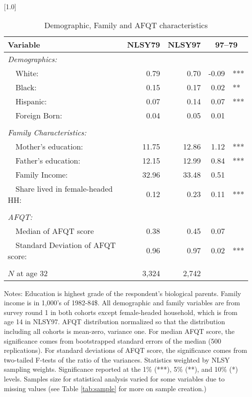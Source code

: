 \begin{table}[ht]
\caption{Demographic, Family and AFQT characteristics}
\label{tab:background}
\centering
\scalebox{1.0}[1.0]{%
\begin{threeparttable}
\begin{tabular}{lrrr@{}l}
\toprule 
Variable & NLSY79 & NLSY97 & \multicolumn{2}{c}{97--79} \\
\midrule 
\multicolumn{5}{l}{\emph{Demographics:}} \\
~~White:                             & 0.79 & 0.70 & -0.09 & *** \\ 
~~Black:                             & 0.15 & 0.17 & 0.02 & ** \\ 
~~Hispanic:                          & 0.07 & 0.14 & 0.07 & *** \\ 
~~Foreign Born:                      & 0.04 & 0.05 & 0.01 &   \\ 
\vspace{-6pt}  \\
\multicolumn{5}{l}{\emph{Family Characteristics:}} \\
~~Mother's education:                & 11.75 & 12.86 & 1.12 & *** \\ 
~~Father's education:                & 12.15 & 12.99 & 0.84 & *** \\ 
~~Family Income:                     & 32.96 & 33.48 & 0.51 &   \\ 
~~Share lived in female-headed HH:   & 0.12 & 0.23 & 0.11 & *** \\ 
\vspace{-6pt}  \\
\multicolumn{5}{l}{\emph{AFQT:}} \\
~~Median of AFQT score               & 0.38 & 0.45 & 0.07 &   \\ 
~~Standard Deviation of AFQT score:  & 0.96 & 0.97 & 0.02 & *** \\ 
\vspace{-6pt}  \\
$N$ at age 32               &  3,324 &  2,742 & & \\ 
\bottomrule 
\end{tabular} 
\footnotesize{Notes: Education is highest grade of the respondent's biological parents. Family income is in 1,000's of 1982-84\$. All demographic and family variables are from survey round 1 in both cohorts except female-headed household, which is from age 14 in NLSY97. AFQT distribution normalized so that the distribution including all cohorts is mean-zero, variance one. For median AFQT score, the significance comes from bootstrapped standard errors of the median (500 replications). For standard deviations of AFQT score, the significance comes from two-tailed F-tests of the ratio of the variances. Statistics weighted by NLSY sampling weights. Significance reported at the 1\% (***), 5\% (**), and 10\% (*) levels. Samples size for statistical analysis varied for some variables due to missing values (see Table \ref{tab:sample} for more on sample creation.)}
\end{threeparttable} 
} 
\end{table} 
